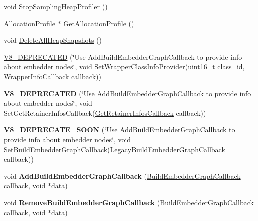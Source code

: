 \begin{DoxyCompactItemize}
\item 
void \mbox{\hyperlink{classv8_1_1HeapProfiler_abc43e12e6febb087be251c0629ff17bf}{Stop\+Sampling\+Heap\+Profiler}} ()
\item 
\mbox{\hyperlink{classv8_1_1AllocationProfile}{Allocation\+Profile}} $\ast$ \mbox{\hyperlink{classv8_1_1HeapProfiler_aaadb22168da6a2889796ed3b5638cd50}{Get\+Allocation\+Profile}} ()
\item 
void \mbox{\hyperlink{classv8_1_1HeapProfiler_a6a75bcc6d8350858597b6a6ce5e349a2}{Delete\+All\+Heap\+Snapshots}} ()
\item 
\mbox{\hyperlink{classv8_1_1HeapProfiler_af41ccd8baea0da8d701e565b7b2e8eab}{V8\+\_\+\+D\+E\+P\+R\+E\+C\+A\+T\+ED}} (\char`\"{}Use Add\+Build\+Embedder\+Graph\+Callback to provide info about embedder nodes\char`\"{}, void Set\+Wrapper\+Class\+Info\+Provider(uint16\+\_\+t class\+\_\+id, \mbox{\hyperlink{classv8_1_1HeapProfiler_a677025dd201fd832e0464e5ab0b0d0d4}{Wrapper\+Info\+Callback}} callback))
\item 
\mbox{\label{classv8_1_1HeapProfiler_a3eec72179d8275779d119eddd999af47}} 
{\bfseries V8\+\_\+\+D\+E\+P\+R\+E\+C\+A\+T\+ED} (\char`\"{}Use Add\+Build\+Embedder\+Graph\+Callback to provide info about embedder nodes\char`\"{}, void Set\+Get\+Retainer\+Infos\+Callback(\mbox{\hyperlink{classv8_1_1HeapProfiler_a7f34c8eb67f9502e5778695187ea0e96}{Get\+Retainer\+Infos\+Callback}} callback))
\item 
\mbox{\label{classv8_1_1HeapProfiler_a079873289f20a9dfcee036b506767c3d}} 
{\bfseries V8\+\_\+\+D\+E\+P\+R\+E\+C\+A\+T\+E\+\_\+\+S\+O\+ON} (\char`\"{}Use Add\+Build\+Embedder\+Graph\+Callback to provide info about embedder nodes\char`\"{}, void Set\+Build\+Embedder\+Graph\+Callback(\mbox{\hyperlink{classv8_1_1HeapProfiler_aafaa85413706329f7767f559b701eb1a}{Legacy\+Build\+Embedder\+Graph\+Callback}} callback))
\item 
\mbox{\label{classv8_1_1HeapProfiler_a4aa69e692d215f7b4599afe2c9dbfbfd}} 
void {\bfseries Add\+Build\+Embedder\+Graph\+Callback} (\mbox{\hyperlink{classv8_1_1HeapProfiler_a29c98afa5ce0ea543eef904201bc3e40}{Build\+Embedder\+Graph\+Callback}} callback, void $\ast$data)
\item 
\mbox{\label{classv8_1_1HeapProfiler_a3f7289d12816af7738944f530d28495d}} 
void {\bfseries Remove\+Build\+Embedder\+Graph\+Callback} (\mbox{\hyperlink{classv8_1_1HeapProfiler_a29c98afa5ce0ea543eef904201bc3e40}{Build\+Embedder\+Graph\+Callback}} callback, void $\ast$data)
\end{DoxyCompactItemize}
